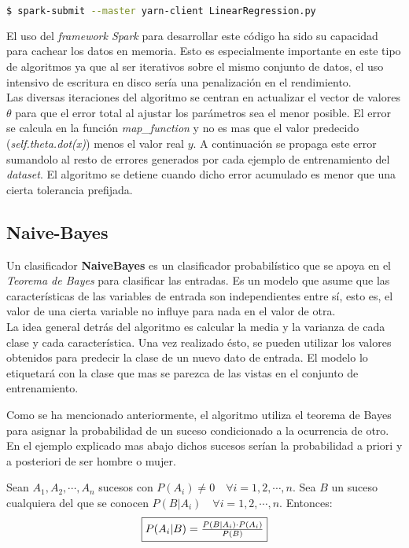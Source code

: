 \begin{lstlisting}[language=bash, numbers=none]
$ spark-submit --master yarn-client LinearRegression.py
\end{lstlisting}

El uso del \textit{framework Spark} para desarrollar este código ha sido su capacidad para cachear los datos en
memoria. Esto es especialmente importante en este tipo de algoritmos ya que al ser iterativos sobre el mismo
conjunto de datos, el uso intensivo de escritura en disco sería una penalización en el rendimiento.\\
Las diversas iteraciones del algoritmo se centran en actualizar el vector de valores $\theta$ para que el error
total al ajustar los parámetros sea el menor posible. El error se calcula en la función \textit{map\_function} 
y no es mas que el valor predecido (\textit{self.theta.dot(x)}) menos el valor real $y$. A continuación se propaga
este error sumandolo al resto de errores generados por cada ejemplo de entrenamiento del \textit{dataset}. El algoritmo
se detiene cuando dicho error acumulado es menor que una cierta tolerancia prefijada.

\clearpage

\subsection{Naive-Bayes}
Un clasificador \textbf{NaiveBayes} es un clasificador probabilístico que se apoya en el 
\textit{Teorema de Bayes} para clasificar las entradas.
Es un modelo que asume que las características de las variables de entrada son independientes 
entre sí, esto es, el valor de una cierta variable no influye para nada en el valor de otra.\\
La idea general detrás del algoritmo es calcular la media y la varianza de cada clase y cada característica.
Una vez realizado ésto, se pueden utilizar los valores obtenidos para predecir la clase de un nuevo 
dato de entrada. El modelo lo etiquetará con la clase que mas se parezca de las vistas en el 
conjunto de entrenamiento.
\newline

Como se ha mencionado anteriormente, el algoritmo utiliza el teorema de Bayes para asignar la probabilidad de
un suceso condicionado a la ocurrencia de otro. En el ejemplo explicado mas abajo dichos sucesos serían la
probabilidad a priori y a posteriori de ser hombre o mujer.

\begin{theorem}
  Sean ${A_1, A_2, \cdots, A_n}$ sucesos con $P(A_i) \neq 0 \quad \forall i=1, 2, \cdots, n$. 
  Sea $B$ un suceso cualquiera del que se conocen $P(B|A_i) \quad \forall i=1, 2, \cdots, n$.
  Entonces:
  {\fboxsep 8pt\fboxrule 1pt
  \begin{equation*}
  \fbox{$ P(A_i|B) = \frac{P(B|A_i) \cdot P(A_i)}{P(B)} $}
  \end{equation*}
  }
\end{theorem}

